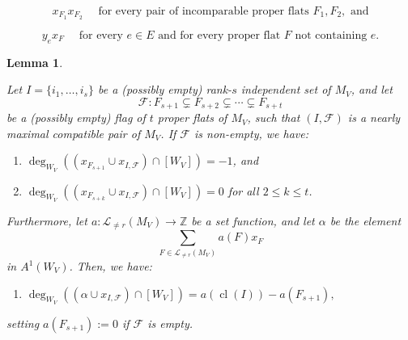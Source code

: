 \documentclass[10pt,a4paper]{amsart}
\newtheorem{lemma}{Lemma}
\newcommand{\cl}{\operatorname{cl}}
\begin{document}
\begin{equation}
\label{eq:ideal_description_2}
\tag{R2}
x_{F_1}x_{F_2} \quad \text{ for every pair of incomparable proper flats } F_1, F_2, \text{ and}
\end{equation}

\begin{equation}
\label{eq:ideal_description_3}
\tag{R3}
y_ex_F \quad \text{ for every $e \in E$ and for every proper flat $F$ not containing $e$.}
\end{equation}

\begin{lemma}
\label{lem:chow_ring_computations}

Let $I = \{i_1,\dots,i_s\}$ be a (possibly empty) rank-$s$ independent set of $M_V$, and let 
\[\mathscr{F}:F_{s+1} \subsetneq F_{s+2} \subsetneq \cdots \subsetneq F_{s+t}\]
be a (possibly empty) flag of $t$ proper flats of $M_V$, such that $(I, \mathscr{F})$ is a nearly maximal compatible pair of $M_V$.
If $\mathscr{F}$ is non-empty, we have:
\begin{enumerate}
    \item[(I)] $\deg_{W_V}((x_{F_{s+1}} \cup x_{I, \mathscr{F}}) \cap [W_V]) = -1$, and
    \item[(II)] $\deg_{W_V}((x_{F_{s+k}} \cup x_{I, \mathscr{F}}) \cap [W_V]) = 0$ for all $2 \leq k \leq t$.
\end{enumerate}
Furthermore, let $a: \mathcal{L}_{\neq r} (M_V) \to \mathbb{Z}$ be a set function, and let $\alpha$ be the element
\[\sum_{F \in \mathcal{L}_{\neq r} (M_V)} a(F)x_F\]
in  $A^1(W_V)$. Then, we have:
\begin{enumerate}
    \item[(III)] $\deg_{W_V}((\alpha \cup x_{I, \mathscr{F}}) \cap [W_V]) = a(\cl(I)) - a(F_{s+1}),$
\end{enumerate}
setting $a(F_{s+1}) := 0$ if $\mathscr{F}$ is empty.
\end{lemma}
\end{document}
